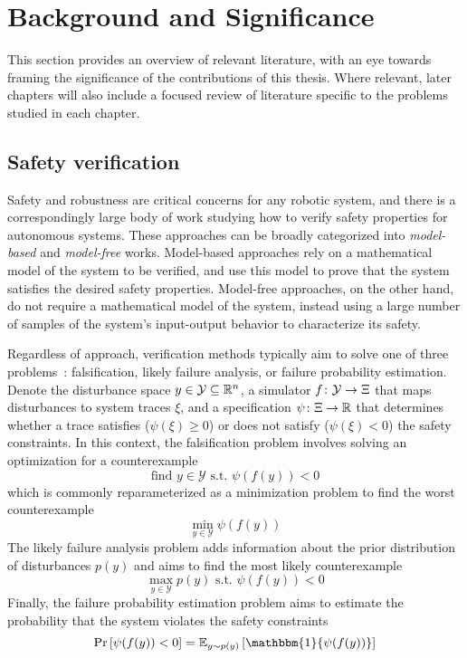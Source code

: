 \chapter{Background and Significance}\label{section:lit_review}

This section provides an overview of relevant literature, with an eye towards framing the significance of the contributions of this thesis. Where relevant, later chapters will also include a focused review of literature specific to the problems studied in each chapter.

\section{Safety verification}

Safety and robustness are critical concerns for any robotic system, and there is a correspondingly large body of work studying how to verify safety properties for autonomous systems. These approaches can be broadly categorized into \textit{model-based} and \textit{model-free} works. Model-based approaches rely on a mathematical model of the system to be verified, and use this model to prove that the system satisfies the desired safety properties. Model-free approaches, on the other hand, do not require a mathematical model of the system, instead using a large number of samples of the system's input-output behavior to characterize its safety.

Regardless of approach, verification methods typically aim to solve one of three problems~\cite{corsoSurveyAlgorithmsBlackBox2021}: falsification, likely failure analysis, or failure probability estimation. Denote the disturbance space $y \in \mathcal{Y} \subseteq \mathbb{R}^n$, a simulator $f \colon \mathcal{Y} \to \Xi$ that maps disturbances to system traces $\xi$, and a specification $\psi \colon \Xi \to \mathbb{R}$ that determines whether a trace satisfies ($\psi(\xi) \geq 0$) or does not satisfy ($\psi(\xi) < 0$) the safety constraints. In this context, the falsification problem involves solving an optimization for a counterexample
%
\begin{equation}
    \text{find } {y \in \mathcal{Y}} \text{ s.t. } \psi(f(y)) < 0
\end{equation}
%
which is commonly reparameterized as a minimization problem to find the worst counterexample
%
\begin{equation}
    \min_{y \in \mathcal{Y}} \psi(f(y))\label{ch4:eq:falsification_opt}
\end{equation}
%
The likely failure analysis problem adds information about the prior distribution of disturbances $p(y)$ and aims to find the most likely counterexample
%
\begin{equation}
    \max_{y \in \mathcal{Y}} p(y) \text{ s.t. } \psi(f(y)) < 0 \label{ch4:eq:likely_failure_opt}
\end{equation}
%
Finally, the failure probability estimation problem aims to estimate the probability that the system violates the safety constraints
%
\begin{equation}
    \Pr\left[\psi(f(y)) < 0\right] = \mathbb{E}_{y \sim p(y)}\left[\mathbbm{1}\{\psi(f(y))\} \right] \label{ch4:eq:failure_probability}
\end{equation}

